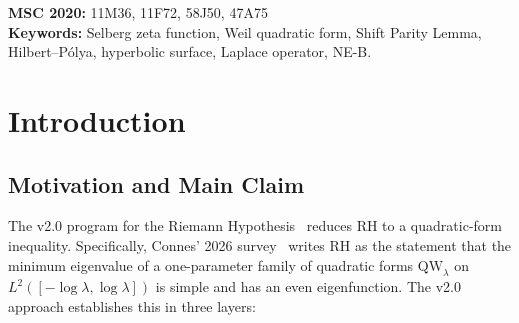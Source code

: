 \documentclass[12pt,a4paper]{article}
\theoremstyle{definition}
\theoremstyle{remark}
\newcommand{\QW}{\mathrm{QW}}
\begin{document}
\begin{abstract}
The failure of NE-B in the Selberg setting is not a defect; it reflects the
geometric coordination of geodesics on a common surface, which is absent for
the primes. We deduce a cautious meta-principle: the v2.0 framework supplies a
common quadratic-form test language, while Hilbert--Pólya is a \emph{special
case} whose existence depends on whether the underlying counting objects admit
a hidden common symmetry. In the Selberg spherical trace-formula channel they
do; in the Riemann case no comparable commutant is supplied by the tested NE-B
route. The Weil quadratic form remains the common object, while an operatorial
realization is an additional structure.
\end{abstract}
\vspace{-0.8em}

\noindent\textbf{MSC 2020:} 11M36, 11F72, 58J50, 47A75\\
\textbf{Keywords:} Selberg zeta function, Weil quadratic form, Shift Parity
Lemma, Hilbert--Pólya, hyperbolic surface, Laplace operator, NE-B.

\clearpage
\tableofcontents
\clearpage

\section{Introduction}
\label{sec:intro}

\subsection{Motivation and Main Claim}

The v2.0 program for the Riemann Hypothesis~\cite{Geiger2026partII}
reduces RH to a quadratic-form inequality. Specifically, Connes' 2026 survey~\cite{Connes2026} writes RH as the statement that the minimum eigenvalue of
a one-parameter family of quadratic forms $\QW_\lambda$ on
$L^2([-\log\lambda,\log\lambda])$ is simple and has an even eigenfunction.
The v2.0 approach establishes this in three layers:
\end{document}
